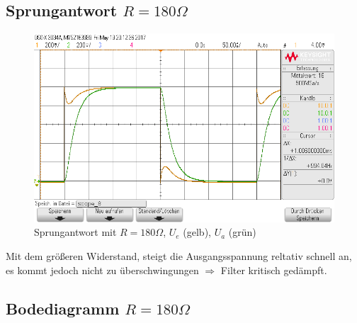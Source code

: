 \subsection{Sprungantwort $R=180\Omega$}

\begin{figure}[H]
  \begin{center}
    \includegraphics[width=1\textwidth]{./Oszi_Bilder/RLC_Sprung_180.png}
    \caption{Sprungantwort mit $R=180\Omega$, $U_e$ (gelb), $U_a$ (gr\"un)}
  \end{center}
\end{figure}
\noindent
Mit dem gr\"o\ss{}eren Widerstand, steigt die Ausgangsspannung reltativ schnell an, es kommt jedoch nicht zu \"uberschwingungen $\Rightarrow$ Filter kritisch ged\"ampft. \\

\subsection{Bodediagramm $R=180\Omega$}

